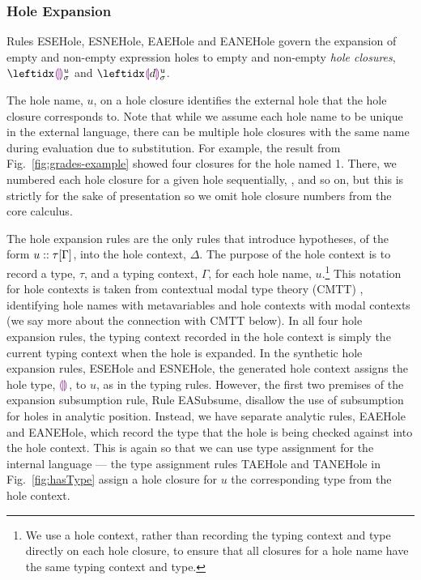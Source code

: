 \subsubsection{Hole Expansion}\label{sec:hole-expansion} 
Rules {ESEHole}, {ESNEHole}, {EAEHole} and {EANEHole} govern the expansion of empty and non-empty expression holes to empty and non-empty \emph{hole closures}, $\dehole{u}{\sigma}{}$ and $\dhole{\dexp}{u}{\sigma}{}$. 
%

The hole name, $u$, on a hole closure identifies the external hole that the hole closure corresponds to. 
Note that while we assume each hole name to be unique in the external language, there can be multiple hole closures with the same name during evaluation due to substitution. 
For example, the result from Fig.~\ref{fig:grades-example} showed four closures for the hole named 1. 
There, we numbered each hole closure for a given hole sequentially, ,  and so on, but this is strictly for the sake of presentation so we omit hole closure numbers from the core calculus.

The hole expansion rules are the only rules that introduce hypotheses, of the form $u :: \tau[\Gamma]$, into the hole context, $\Delta$. 
The purpose of the hole context is to record a type, $\tau$, and a typing context, $\Gamma$, for each hole name, $u$.\footnote{
We use a hole context, rather than recording the typing context and type directly on each hole closure, to ensure that all closures for a hole name have the same typing context and type.} 
This notation for hole contexts is taken from contextual modal type theory (CMTT) \cite{Nanevski2008}, identifying hole names with metavariables and hole contexts with modal contexts (we say more about the connection with CMTT below). 
In all four hole expansion rules, the typing context recorded in the hole context is simply the current typing context when the hole is expanded. 
In the synthetic hole expansion rules, {ESEHole} and {ESNEHole}, the generated hole context assigns the hole type, $\textcolor{violet}{\llparenthesis}\textcolor{violet}{\rrparenthesis}$, to $u$, as in the typing rules. 
However, the first two premises of the expansion subsumption rule, Rule EASubsume, disallow the use of subsumption for holes in analytic position. 
Instead, we have separate analytic rules, {EAEHole} and {EANEHole}, which record the type that the hole is being checked against into the hole context. 
This is again so that we can use type assignment for the internal language --- the type assignment rules TAEHole and TANEHole in Fig.~\ref{fig:hasType} assign a hole closure for $u$ the corresponding type from the hole context.

